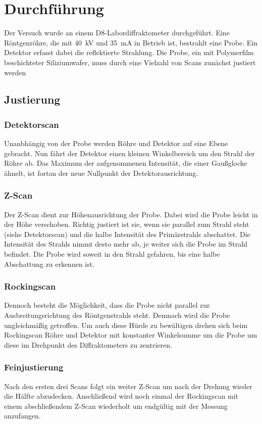 \section{Durchführung}
\label{sec:Durchführung}
Der Versuch wurde an einem D8-Labordiffraktometer durchgeführt.
Eine Röntgenröhre, die mit \qty{40}{\kilo\volt} und \qty{35}{\milli\ampere} in Betrieb ist,
bestrahlt eine Probe. Ein Detektor erfasst dabei die reflektierte Strahlung.
Die Probe, ein mit Polymerfilm beschichteter Siliziumwafer, muss durch eine Vielzahl von Scans zunächst justiert werden

\subsection{Justierung}
\subsubsection*{Detektorscan}
Unanbhängig von der Probe werden Röhre und Detektor auf eine Ebene gebracht. Nun fährt der Detektor einen kleinen Winkelbereich um den Strahl der Röhre ab.
Das Maximum der aufgenommenen Intensität, die einer Gaußglocke ähnelt, ist fortan der neue Nullpunkt der Detektorausrichtung.

\subsubsection*{Z-Scan}
Der Z-Scan dient zur Höhenausrichtung der Probe.
Dabei wird die Probe leicht in der Höhe verschoben.
Richtig justiert ist sie,
wenn sie parallel zum Strahl steht (siehe Detektorscan) und die halbe Intensität des Primärstrahls abschattet.
Die Intensität des Strahls nimmt desto mehr ab, je weiter sich die Probe im Strahl befindet.
Die Probe wird soweit in den Strahl gefahren, bis eine halbe Abschattung zu erkennen ist. 

\subsubsection*{Rockingscan}
Dennoch besteht die Möglichkeit, dass die Probe nicht parallel zur Ausbreitungsrichtung des Röntgenstrahls steht.
Demnach wird die Probe ungleichmäßig getroffen. Um auch diese Hürde zu bewältigen drehen sich beim Rockingscan
Röhre und Detektor mit konstanter Winkelsumme um die Probe um diese im Drehpunkt des Diffraktometers zu zentrieren.

\subsubsection*{Feinjustierung}
Nach den ersten drei Scans folgt ein weiter Z-Scan um nach der Drehung wieder die Hälfte abzudecken.
Anschließend wird noch einmal der Rockingscan mit einem abschließendem Z-Scan wiederholt um endgültig mit der Messung anzufangen.

